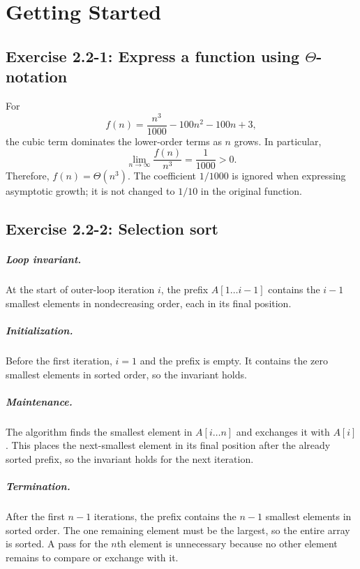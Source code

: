 \chapter{Getting Started}

\section{Exercise 2.2-1: Express a function using $\Theta$-notation}

For
\begin{equation*}
    f(n) = \frac{n^3}{1000} - 100n^2 - 100n + 3,
\end{equation*}
the cubic term dominates the lower-order terms as $n$ grows. In particular,
\begin{equation*}
    \lim_{n \to \infty} \frac{f(n)}{n^3} = \frac{1}{1000} > 0.
\end{equation*}
Therefore, $f(n) = \Theta(n^3)$. The coefficient $1/1000$ is ignored when
expressing asymptotic growth; it is not changed to $1/10$ in the original
function.

\section{Exercise 2.2-2: Selection sort}

\paragraph{Loop invariant.}
At the start of outer-loop iteration $i$, the prefix $A[1 \ldots i-1]$
contains the $i-1$ smallest elements in nondecreasing order, each in its final
position.

\paragraph{Initialization.}
Before the first iteration, $i=1$ and the prefix is empty. It contains the
zero smallest elements in sorted order, so the invariant holds.

\paragraph{Maintenance.}
The algorithm finds the smallest element in $A[i \ldots n]$ and exchanges it
with $A[i]$. This places the next-smallest element in its final position after
the already sorted prefix, so the invariant holds for the next iteration.

\paragraph{Termination.}
After the first $n-1$ iterations, the prefix contains the $n-1$ smallest
elements in sorted order. The one remaining element must be the largest, so the
entire array is sorted. A pass for the $n$th element is unnecessary because no
other element remains to compare or exchange with it.

